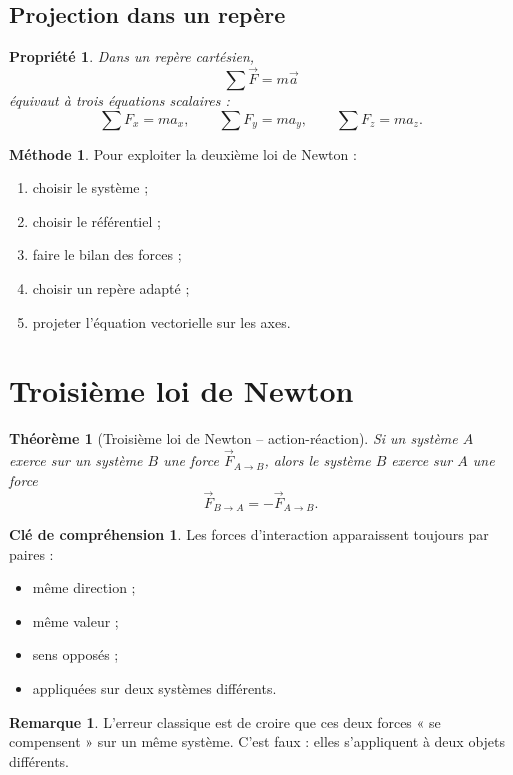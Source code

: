 \documentclass[11pt,a4paper]{article}
\theoremstyle{definition}
\newtheorem{remarque}[definition]{Remarque}
\newtheorem{methode}[definition]{Méthode}
\newtheorem{interpretation}[definition]{Clé de compréhension}
\theoremstyle{plain}
\newtheorem{propriete}[definition]{Propriété}
\newtheorem{theoreme}[definition]{Théorème}
\theoremstyle{remark}
\begin{document}
\subsection{Projection dans un repère}

\begin{propriete}
Dans un repère cartésien,
\[
\sum \vec{F}=m\vec{a}
\]
équivaut à trois équations scalaires :
\[
\sum F_x=ma_x,\qquad \sum F_y=ma_y,\qquad \sum F_z=ma_z.
\]
\end{propriete}

\begin{methode}
Pour exploiter la deuxième loi de Newton :
\begin{enumerate}
    \item choisir le système ;
    \item choisir le référentiel ;
    \item faire le bilan des forces ;
    \item choisir un repère adapté ;
    \item projeter l'équation vectorielle sur les axes.
\end{enumerate}
\end{methode}

\section{Troisième loi de Newton}

\begin{theoreme}[Troisième loi de Newton -- action-réaction]
Si un système $A$ exerce sur un système $B$ une force $\vec{F}_{A\to B}$, alors le système $B$ exerce sur $A$ une force
\[
\vec{F}_{B\to A}=-\vec{F}_{A\to B}.
\]
\end{theoreme}

\begin{interpretation}
Les forces d'interaction apparaissent toujours par paires :
\begin{itemize}
    \item même direction ;
    \item même valeur ;
    \item sens opposés ;
    \item appliquées sur deux systèmes différents.
\end{itemize}
\end{interpretation}

\begin{remarque}
L'erreur classique est de croire que ces deux forces « se compensent » sur un même système. C'est faux : elles s'appliquent à deux objets différents.
\end{remarque}
\end{document}
